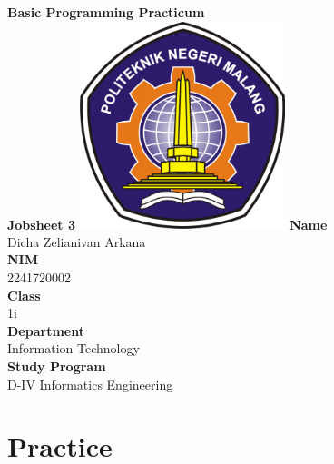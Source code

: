 \documentclass[12pt,titlepage]{article}
\begin{document}
\begin{titlepage}
    \centering
    \vfill
    {\bfseries\LARGE
        Basic Programming Practicum\\
        \vskip0.25cm
        Jobsheet 3
    }
    \vfill
    \includegraphics[width=6cm]{images/polinema-logo.png}
    \vfill
    {\textbf{Name}\\
        Dicha Zelianivan Arkana\\
        \vskip0.5cm
        \textbf{NIM}\\
        2241720002\\
        \vskip0.5cm
        \textbf{Class}\\
        1i\\
        \vskip0.5cm
        \textbf{Department}\\
        Information Technology\\
        \vskip0.5cm
        \textbf{Study Program}\\
        D-IV Informatics Engineering}
\end{titlepage}

\section{Practice}
\end{document}
